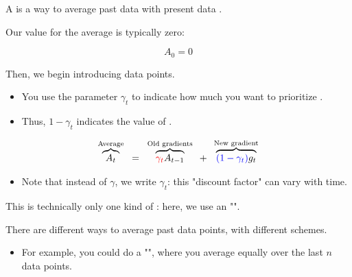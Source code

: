            \begin{definition}
                A  is a way to average past data with present data .

                Our  value for the average is typically zero:

                \begin{equation*}
                    A_0=0
                \end{equation*}

                Then, we begin introducing  data points.
                
                \begin{itemize}
                    \item You use the parameter $\gamma_t$ to indicate how much you want to prioritize .
                    \item Thus, $1-\gamma_t$ indicates the value of .
                \end{itemize}

                \begin{equation*}
                    \overbrace{
                        A_t 
                    }^{\text{Average}}
                    \;\;=\;\;
                    \overbrace{
                        \textcolor{red}{\gamma_t} A_{t-1}
                    }^{\text{Old gradients}}
                    \;\;+\;\; 
                    \overbrace{
                        \textcolor{blue}{(1-\gamma_t)} g_{t}
                    }^{\text{New gradient}}
                \end{equation*}

                \phantom{}

                \begin{itemize}
                    \item Note that instead of $\gamma$, we write $\gamma_t$: this "discount factor" can vary with time.

                \end{itemize}

                
            \end{definition}

            \phantom{}

            \begin{clarification}
                This is technically only one kind of : here, we use an "". 

                There are different ways to average past data points, with different  schemes.
                    
                    \begin{itemize}
                        \item For example, you could do a "", where you average equally over the last $n$ data points.
                    \end{itemize}
            \end{clarification}

